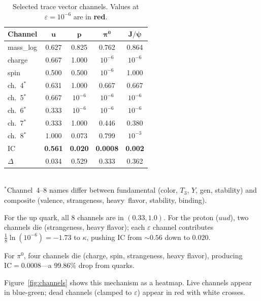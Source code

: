 \documentclass[11pt,a4paper]{article}
\theoremstyle{plain}
\theoremstyle{definition}
\theoremstyle{remark}
\newcommand{\eps}{\varepsilon}
\newcommand{\IC}{\mathrm{IC}}
\begin{document}
\begin{table}[H]
\caption{Selected trace vector channels.
Values at $\eps = 10^{-6}$ are in
\textcolor{CliffRed}{\textbf{red}}.}
\label{tab:channels}
\centering\small
\begin{tabular}{@{}lcccc@{}}
\toprule
\textbf{Channel} & $\bm{u}$ & $\bm{p}$ &
  $\bm{\pi^0}$ & $\bm{J/\psi}$ \\
\midrule
mass\_log   & 0.627 & 0.825 & 0.762 & 0.864 \\
charge      & 0.667 & 1.000 &
  \textcolor{CliffRed}{$10^{-6}$} &
  \textcolor{CliffRed}{$10^{-6}$} \\
spin        & 0.500 & 0.500 &
  \textcolor{CliffRed}{$10^{-6}$} & 1.000 \\
ch.~4$^{*}$ & 0.631 & 1.000 & 0.667 & 0.667 \\
ch.~5$^{*}$ & 0.667 &
  \textcolor{CliffRed}{$10^{-6}$} &
  \textcolor{CliffRed}{$10^{-6}$} &
  \textcolor{CliffRed}{$10^{-6}$} \\
ch.~6$^{*}$ & 0.333 &
  \textcolor{CliffRed}{$10^{-6}$} &
  \textcolor{CliffRed}{$10^{-6}$} &
  \textcolor{CliffRed}{$10^{-6}$} \\
ch.~7$^{*}$ & 0.333 & 1.000 & 0.446 & 0.380 \\
ch.~8$^{*}$ & 1.000 & 0.073 & 0.799 & $10^{-3}$ \\
\midrule
$\IC$       & \textbf{0.561} & \textbf{0.020} &
  \textbf{0.0008} & \textbf{0.002} \\
$\Delta$    & 0.034 & 0.529 & 0.333 & 0.362 \\
\bottomrule
\end{tabular}\\[4pt]
{\footnotesize $^{*}$Channel~4--8 names differ between fundamental
(color, $T_3$, $Y$, gen, stability) and composite (valence,
strangeness, heavy~flavor, stability, binding).}
\end{table}

For the up quark, all 8 channels are in $(0.33, 1.0)$.  For the
proton ($uud$), two channels die (strangeness, heavy flavor); each
$\eps$ channel contributes $\frac{1}{8}\ln(10^{-6}) = -1.73$ to
$\kappa$, pushing IC from $\sim 0.56$ down to $0.020$.

For $\pi^0$, four channels die (charge, spin, strangeness, heavy
flavor), producing $\IC = 0.0008$---a $99.86\%$ drop from quarks.

Figure~\ref{fig:channels} shows this mechanism as a heatmap.
Live channels appear in blue-green; dead channels
(clamped to $\eps$) appear in red with white crosses.
\end{document}

